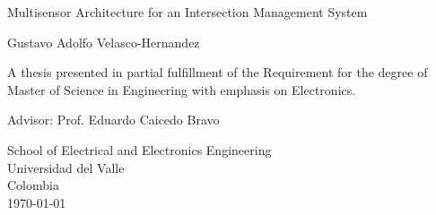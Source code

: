 \begin{titlepage}
    \begin{center}
        \vspace*{1cm}
        \Huge        
        Multisensor Architecture for an Intersection Management System
   
        \vspace{3.5cm}
        \LARGE
        Gustavo Adolfo Velasco-Hernandez
        
        \vfill
        \large
		        
        
        A thesis presented in partial fulfillment of the Requirement for the degree of Master of Science in Engineering with emphasis on Electronics.
        
        \vspace{2cm}
        
        Advisor: Prof. Eduardo Caicedo Bravo
		
		\vspace{2cm}
        
        
        School of Electrical and Electronics Engineering\\
        Universidad del Valle\\
        Colombia\\
        \today
        
    \end{center}
\end{titlepage}